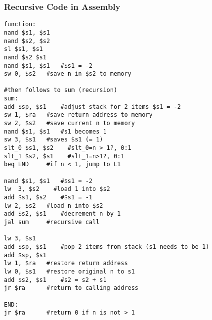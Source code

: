 \documentclass[11pt, titlepage]{article}
\begin{document}
\subsubsection{Recursive Code in Assembly}
\begin{lstlisting}[language=Ant]
function:
nand $s1, $s1
nand $s2, $s2  
sl $s1, $s1
nand $s2 $s1
nand $s1, $s1   #$s1 = -2 
sw 0, $s2   #save n in $s2 to memory

#then follows to sum (recursion)
sum:
add $sp, $s1    #adjust stack for 2 items $s1 = -2
sw 1, $ra   #save return address to memory
sw 2, $s2   #save current n to memory
nand $s1, $s1   #s1 becomes 1
sw 3, $s1   #saves $s1 (= 1)
slt_0 $s1, $s2    #slt_0=n > 1?, 0:1  
slt_1 $s2, $s1    #slt_1=n>1?, 0:1  
beq END     #if n < 1, jump to L1

nand $s1, $s1   #$s1 = -2
lw  3, $s2    #load 1 into $s2
add $s1, $s2    #$s1 = -1
lw 2, $s2   #load n into $s2
add $s2, $s1    #decrement n by 1
jal sum     #recursive call

lw 3, $s1
add $sp, $s1    #pop 2 items from stack (s1 needs to be 1)
add $sp, $s1
lw 1, $ra   #restore return address
lw 0, $s1   #restore original n to s1
add $s2, $s1    #s2 = s2 + s1
jr $ra      #return to calling address

END: 
jr $ra      #return 0 if n is not > 1
\end{lstlisting}
\end{document}
